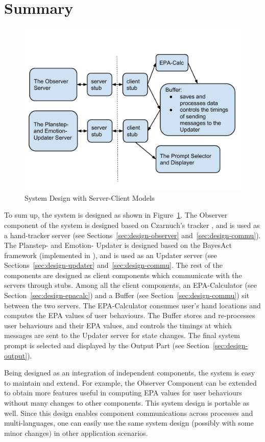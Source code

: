 \section{Summary}

\begin{figure}[htp]
\centering
\includegraphics[trim = 0mm 15mm 0mm 20mm, clip, width=0.9\linewidth]{fig/fig-system.pdf}
\caption{System Design with Server-Client Models}
\label{fig:system}
\end{figure}

To sum up, the system is designed as shown in Figure~\ref{fig:system}. The Observer component of the system is designed based on Czarnuch's tracker \cite{czarnuch2014}, and is used as a hand-tracker server (see Sections~\ref{sec:design-observer} and~\ref{sec:design-commu}). The Planstep- and Emotion- Updater is designed based on the BayesAct framework (implemented in \cite{hoey2013bayesian}), and is used as an Updater server (see Sections~\ref{sec:design-updater} and~\ref{sec:design-commu}. The rest of the components are designed as client components which communicate with the servers through stubs. Among all the client components, an EPA-Calculator (see Section~\ref{sec:design-epacalc}) and a Buffer (see Section~\ref{sec:design-commu}) sit between the two servers. The EPA-Calculator consumes user's hand locations and computes the EPA values of user behaviours. The Buffer stores and re-processes user behaviours and their EPA values, and controls the timings at which messages are sent to the Updater server for state changes. The final system prompt is selected and displayed by the Output Part (see Section~\ref{sec:design-output}).

Being designed as an integration of independent components, the system is easy to maintain and extend. For example, the Observer Component can be extended to obtain more features useful in computing EPA values for user behaviours without many changes to other components. This system design is portable as well. Since this design enables component communications across processes and multi-languages, one can easily use the same system design (possibly with some minor changes) in other application scenarios.


